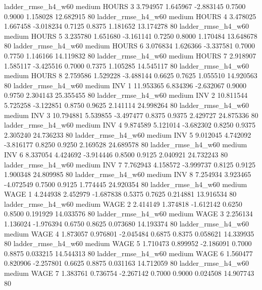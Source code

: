     ladder_rmse_h4_w60     medium    HOURS                 3  3.794957 1.645967 -2.883145 0.7500 0.9000  1.158028   12.682915 80
    ladder_rmse_h4_w60     medium    HOURS                 4  3.478025 1.667458 -3.018234 0.7125 0.8375  1.181652   13.174278 80
    ladder_rmse_h4_w60     medium    HOURS                 5  3.235780 1.651680 -3.161141 0.7250 0.8000  1.170484   13.648678 80
    ladder_rmse_h4_w60     medium    HOURS                 6  3.076834 1.626366 -3.337581 0.7000 0.7750  1.146166   14.119832 80
    ladder_rmse_h4_w60     medium    HOURS                 7  2.918907 1.585117 -3.425516 0.7000 0.7375  1.105285   14.545117 80
    ladder_rmse_h4_w60     medium    HOURS                 8  2.759586 1.529228 -3.488144 0.6625 0.7625  1.055510   14.920563 80
    ladder_rmse_h4_w60     medium      INV                 1 11.953365 6.834396 -2.632067 0.9000 0.9750  2.304143   25.355455 80
    ladder_rmse_h4_w60     medium      INV                 2 10.811544 5.725258 -3.122851 0.8750 0.9625  2.141114   24.998264 80
    ladder_rmse_h4_w60     medium      INV                 3 10.794881 5.539855 -3.497477 0.8375 0.9375  2.429727   24.875336 80
    ladder_rmse_h4_w60     medium      INV                 4  9.874589 5.121014 -3.682302 0.8250 0.9375  2.305240   24.736233 80
    ladder_rmse_h4_w60     medium      INV                 5  9.012045 4.742092 -3.816177 0.8250 0.9250  2.169528   24.689578 80
    ladder_rmse_h4_w60     medium      INV                 6  8.337054 4.424692 -3.914446 0.8500 0.9125  2.040921   24.732243 80
    ladder_rmse_h4_w60     medium      INV                 7  7.762943 4.158572 -3.999737 0.8125 0.9125  1.900348   24.809985 80
    ladder_rmse_h4_w60     medium      INV                 8  7.254934 3.923465 -4.072549 0.7500 0.9125  1.774445   24.920354 80
    ladder_rmse_h4_w60     medium     WAGE                 1  4.244938 2.452979 -1.687838 0.5375 0.7625  0.214881   13.916534 80
    ladder_rmse_h4_w60     medium     WAGE                 2  2.414149 1.374818 -1.612142 0.6250 0.8500  0.191929   14.033576 80
    ladder_rmse_h4_w60     medium     WAGE                 3  2.256134 1.136024 -1.976394 0.6750 0.8625  0.073680   14.193374 80
    ladder_rmse_h4_w60     medium     WAGE                 4  1.873057 0.976801 -2.045484 0.6875 0.8375  0.058621   14.339935 80
    ladder_rmse_h4_w60     medium     WAGE                 5  1.710473 0.899952 -2.186091 0.7000 0.8875  0.033215   14.544313 80
    ladder_rmse_h4_w60     medium     WAGE                 6  1.560477 0.820906 -2.257801 0.6625 0.8875  0.031163   14.712059 80
    ladder_rmse_h4_w60     medium     WAGE                 7  1.383761 0.736754 -2.267142 0.7000 0.9000  0.024508   14.907743 80
